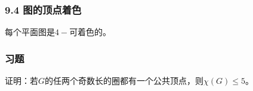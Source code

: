 \documentclass{beamer}
\begin{document}
\begin{CJK}{UTF8}{gbsn}
\begin{frame}
  \frametitle{9.4 图的顶点着色}
  \begin{theorem9.4.6}
    每个平面图是$4-$可着色的。
  \end{theorem9.4.6}
\end{frame}
\begin{frame}
  \frametitle{习题}
  \begin{Exercise}
    证明：若$G$的任两个奇数长的圈都有一个公共顶点，则$\chi(G)\leq 5$。
  \end{Exercise}
\end{frame}
\end{CJK}
\end{document}
